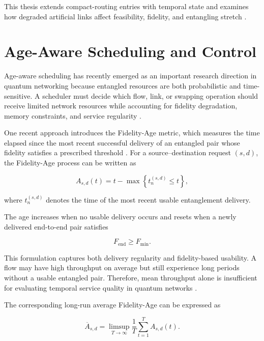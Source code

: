 This thesis extends compact-routing entries with temporal state and examines
how degraded artificial links affect feasibility, fidelity, and entangling
stretch \cite{ercetin2026fidelityage,ceran2026age}.
\section{Age-Aware Scheduling and Control}

Age-aware scheduling has recently emerged as an important research direction in quantum networking because entangled resources are both probabilistic and time-sensitive. A scheduler must decide which flow, link, or swapping operation should receive limited network resources while accounting for fidelity degradation, memory constraints, and service regularity \cite{ercetin2026fidelityage,ceran2026age}.

One recent approach introduces the Fidelity-Age metric, which measures the time elapsed since the most recent successful delivery of an entangled pair whose fidelity satisfies a prescribed threshold \cite{ercetin2026fidelityage}. For a source--destination request $(s,d)$, the Fidelity-Age process can be written as

\begin{equation}
    A_{s,d}(t)
    =
    t
    -
    \max
    \left\{
    t_n^{(s,d)}
    \leq t
    \right\},
\end{equation}

where $t_n^{(s,d)}$ denotes the time of the most recent usable entanglement delivery.

The age increases when no usable delivery occurs and resets when a newly delivered end-to-end pair satisfies

\begin{equation}
    F_{\mathrm{end}}
    \geq
    F_{\min}.
\end{equation}

This formulation captures both delivery regularity and fidelity-based usability. A flow may have high throughput on average but still experience long periods without a usable entangled pair. Therefore, mean throughput alone is insufficient for evaluating temporal service quality in quantum networks \cite{ercetin2026fidelityage}.

The corresponding long-run average Fidelity-Age can be expressed as

\begin{equation}
    \overline{A}_{s,d}
    =
    \limsup_{T\rightarrow\infty}
    \frac{1}{T}
    \sum_{t=1}^{T}
    A_{s,d}(t).
\end{equation}

